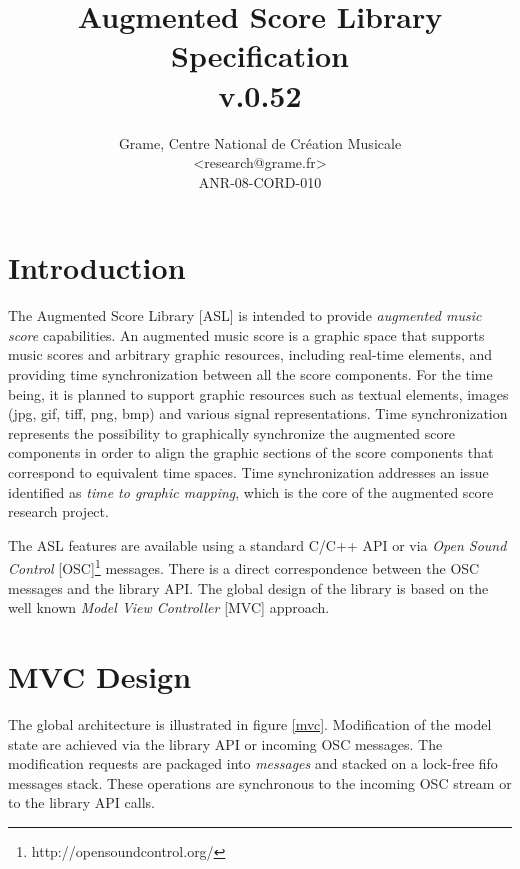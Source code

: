 \documentclass[a4paper]{article}
\newcommand{\ASL}			{ASL}
\begin{document}
\title{Augmented Score Library Specification \\ v.0.52}


\author{Grame, Centre National de Création Musicale\\
{\small <research@grame.fr>} \\
\vspace{2mm}
ANR-08-CORD-010
}

\maketitle

\section{Introduction}

The Augmented Score Library [\ASL] is intended to provide \emph{augmented music score} capabilities.
An augmented music score is a graphic space that supports music scores and arbitrary graphic resources, including real-time elements, and providing time synchronization between all the score components. For the time being, it is planned to support graphic resources such as textual elements, images (jpg, gif, tiff, png, bmp) and various signal representations. Time synchronization represents the possibility to graphically synchronize the augmented score components in order to align the graphic sections of the score components that correspond to equivalent time spaces.
Time synchronization addresses an issue identified as \emph{time to graphic mapping}, which is the core of the augmented score research project. 

The ASL features are available using a standard C/C++ API or via \emph{Open Sound Control}\cite{OSC} [OSC]\footnote{http://opensoundcontrol.org/} messages. There is a direct correspondence between the OSC messages and the library API. The global design of the library is based on the well known \emph{Model View Controller} [MVC] approach.

\section{MVC Design}

The global architecture is illustrated in figure \ref{mvc}. Modification of the model state are achieved via the library API or incoming OSC messages. The modification requests are packaged into \emph{messages} and stacked on a lock-free fifo messages stack. These operations are synchronous to the incoming OSC stream or to the library API calls. 
\end{document}
